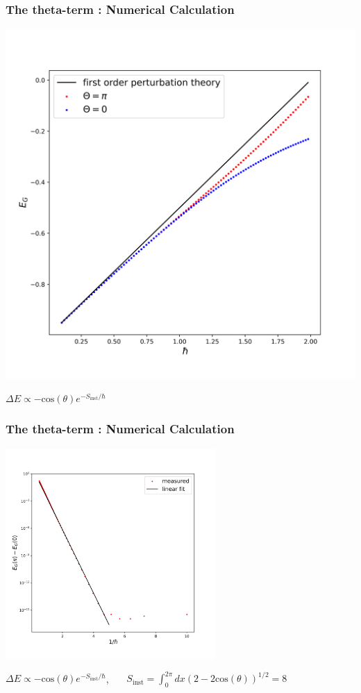 \documentclass[10pt]{beamer}
\begin{document}
\begin{frame}
    \frametitle{The theta-term : Numerical Calculation}
        \includegraphics[width=0.8 \textwidth]{E_G.png}

        $\Delta E \propto -\text{cos}(\theta)e^{-S_{\text{inst}}/\hbar}$
\end{frame}
\begin{frame}
    \frametitle{The theta-term : Numerical Calculation}

        \includegraphics[width=0.6\textwidth]{E_G_diff.png}

     $\Delta E \propto -\text{cos}(\theta)e^{-S_{\text{inst}}/\hbar}$, \ \ \ 
     $S_{\text{inst}} = \int_0^{2\pi} dx \left(2-2\text{cos}(\theta)\right)^{1/2}=8$
    \end{frame}
\end{document}
